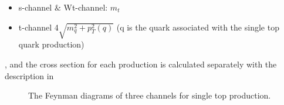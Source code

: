\begin{itemize}
	\item s-channel $\&$ Wt-channel: $m_{t}$
	\item t-channel 4\times$\sqrt{m_{q}^2+p^2_{T}(q)}$ (q is the quark  associated with the single top quark production)
\end{itemize}
, and the cross section for each production is calculated separately with the description in \cite{Kidonakis:2011wy,Kidonakis:2010ux}
\begin{figure}[htp]
	\centering
	\hfill
	\hfill
	\caption{The Feynman diagrams of three channels for single top production.}
	\label{Fig:singletop}
\end{figure}


